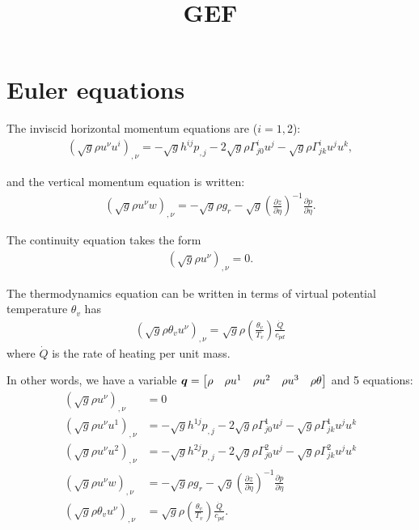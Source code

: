 \documentclass{article}
\title{GEF}
\begin{document}
\maketitle

\section{Euler equations}

The inviscid horizontal momentum equations are ($i=1,2$):
\begin{align}
\left( \sqrt{g}\rho u^\nu u^i\right)_{,\nu} = - \sqrt{g}h^{ij}p_{,j} -2\sqrt{g} \rho \Gamma^i_{j0} u^j - \sqrt{g} \rho \Gamma^i_{jk}u^ju^k,
\end{align}

and the vertical momentum equation is written:
\begin{align}
\left(\sqrt{g}\rho u^\nu w\right)_{,\nu}=-\sqrt{g}\rho g_r-\sqrt{g} \left(\frac{\partial z}{\partial \eta}\right)^{-1} \frac{\partial p}{\partial\eta}.
\end{align}

The continuity equation takes the form
\begin{align}
\left( \sqrt{g}\rho u^\nu \right)_{,\nu} = 0.
\end{align}

The thermodynamics equation can be written in terms of virtual potential temperature $\theta_v$ has
\begin{align}
   \left( \sqrt{g}\rho \theta_v u^\nu \right)_{,\nu} = \sqrt{g} \rho \left( \frac{\theta_v}{T_v} \right) \frac{\dot{Q}}{c_{pd}}
\end{align}
where $\dot{Q}$ is the rate of heating per unit mass.

In other words, we have a variable
$\bm{q} = \left[\begin{matrix}\rho & \rho u^1 & \rho u^2 & \rho u^3 & \rho\theta\end{matrix}\right]$
and 5 equations:
\begin{align}
\left( \sqrt{g}\rho u^\nu \right)_{,\nu} &= 0 \\
\left( \sqrt{g}\rho u^\nu u^1\right)_{,\nu} &=
    - \sqrt{g}h^{1j}p_{,j} -2\sqrt{g} \rho \Gamma^1_{j0} u^j - \sqrt{g} \rho \Gamma^1_{jk}u^ju^k \\
\left( \sqrt{g}\rho u^\nu u^2\right)_{,\nu} &=
    - \sqrt{g}h^{2j}p_{,j} -2\sqrt{g} \rho \Gamma^2_{j0} u^j - \sqrt{g} \rho \Gamma^2_{jk}u^ju^k \\
\left(\sqrt{g}\rho u^\nu w\right)_{,\nu} &=
    -\sqrt{g}\rho g_r-\sqrt{g} \left(\frac{\partial z}{\partial \eta}\right)^{-1} \frac{\partial p}{\partial\eta} \\
\left( \sqrt{g}\rho \theta_v u^\nu \right)_{,\nu} &=
    \sqrt{g} \rho \left( \frac{\theta_v}{T_v} \right) \frac{\dot{Q}}{c_{pd}}
    \text{.}
\end{align}
\end{document}
